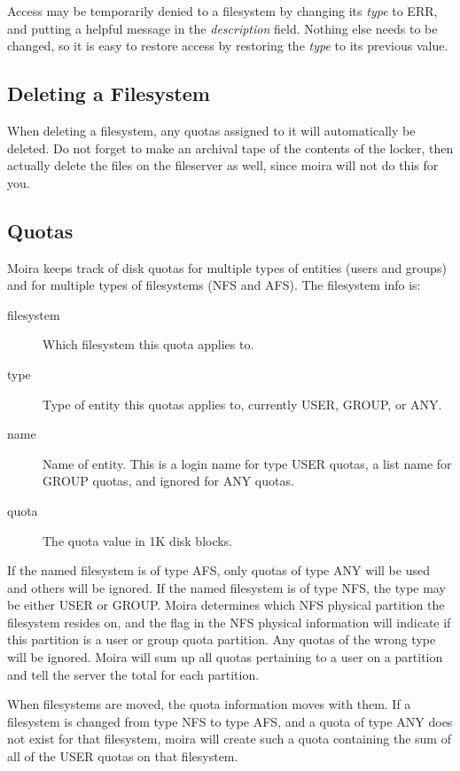 Access may be temporarily denied to a filesystem by changing its
{\em type} to ERR, and putting a helpful message in the {\em description}
field.  Nothing else needs to be changed, so it is easy to restore
access by restoring the {\em type} to its previous value.

\subsection{Deleting a Filesystem}

When deleting a filesystem, any quotas assigned to it will
automatically be deleted.  Do not forget to make an archival tape of
the contents of the locker, then actually delete the files on the
fileserver as well, since moira will not do this for you.

\subsection{Quotas}

Moira keeps track of disk quotas for multiple types of entities (users
and groups) and for multiple types of filesystems (NFS and AFS).  The
filesystem info is:
\begin{description}
\item[filesystem] Which filesystem this quota applies to.
\item[type] Type of entity this quotas applies to, currently USER, GROUP, or
ANY. 
\item[name] Name of entity.  This is a login name for type USER quotas, a
list name for GROUP quotas, and ignored for ANY quotas.
\item[quota] The quota value in 1K disk blocks.
\end{description}

 If the named filesystem is of type AFS, only quotas of
type ANY will be used and others will be ignored.   If the
named filesystem is of type NFS, the type may be either USER or GROUP.
Moira determines which NFS physical partition the filesystem resides
on, and the flag in the NFS physical information will indicate if this
partition is a user or group quota partition.  Any quotas of the wrong
type will be ignored.  Moira will sum up all quotas pertaining to a
user on a partition and tell the server the total for each partition.

When filesystems are moved, the quota information moves with them.  If
a filesystem is changed from type NFS to type AFS, and a quota of type
ANY does not exist for that filesystem, moira will create such a quota
containing the sum of all of the USER quotas on that filesystem.

